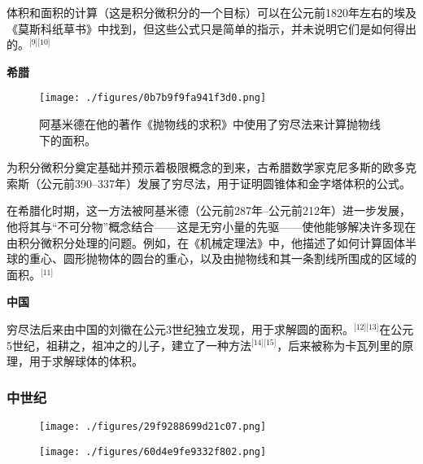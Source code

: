 体积和面积的计算（这是积分微积分的一个目标）可以在公元前1820年左右的埃及《莫斯科纸草书》中找到，但这些公式只是简单的指示，并未说明它们是如何得出的。\(^\text{[9][10]}\)

\textbf{希腊}

\begin{figure}[ht]
\centering
\texttt{[image: ./figures/0b7b9f9fa941f3d0.png]}
\caption{阿基米德在他的著作《抛物线的求积》中使用了穷尽法来计算抛物线下的面积。} \label{fig_Calcul_1}
\end{figure}
为积分微积分奠定基础并预示着极限概念的到来，古希腊数学家克尼多斯的欧多克索斯（公元前390–337年）发展了穷尽法，用于证明圆锥体和金字塔体积的公式。

在希腊化时期，这一方法被阿基米德（公元前287年–公元前212年）进一步发展，他将其与“不可分物”概念结合——这是无穷小量的先驱——使他能够解决许多现在由积分微积分处理的问题。例如，在《机械定理法》中，他描述了如何计算固体半球的重心、圆形抛物体的圆台的重心，以及由抛物线和其一条割线所围成的区域的面积。\(^\text{[11]}\)

\textbf{中国} 

穷尽法后来由中国的刘徽在公元3世纪独立发现，用于求解圆的面积。\(^\text{[12][13]}\)在公元5世纪，祖耕之，祖冲之的儿子，建立了一种方法\(^\text{[14][15]}\)，后来被称为卡瓦列里的原理，用于求解球体的体积。
\subsubsection{中世纪}
\begin{figure}[ht]
\centering
\texttt{[image: ./figures/29f9288699d21c07.png]}
\caption{} \label{fig_Calcul_2}
\end{figure}
\begin{figure}[ht]
\centering
\texttt{[image: ./figures/60d4e9fe9332f802.png]}
\caption{} \label{fig_Calcul_3}
\end{figure}